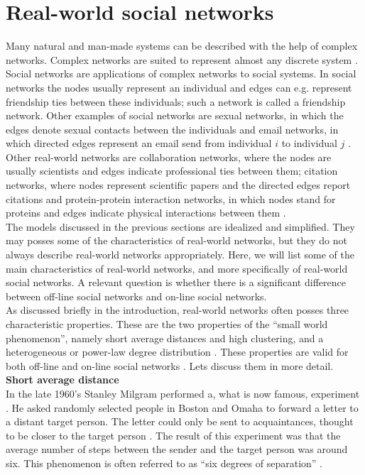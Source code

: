 \documentclass[11 pt , letterpaper , twoside , openright]{book}
\begin{document}
\section{Real-world social networks}\label{realWorld}

Many natural and man-made systems can be described with the help of complex networks. Complex networks are suited to represent almost any discrete system \cite{Costa2008}. Social networks are applications of complex networks to social systems. In social networks the nodes usually represent an individual and edges can e.g. represent friendship ties between these individuals; such a network is called a friendship network. Other examples of social networks are sexual networks, in which the edges denote sexual contacts between the individuals and email networks, in which directed edges represent an email send from individual $i$ to individual $j$ \cite{Costa2008}. Other real-world networks are collaboration networks, where the nodes are usually scientists and edges indicate professional ties between them; citation networks, where nodes represent scientific papers and the directed edges report citations and protein-protein interaction networks, in which nodes stand for proteins and edges indicate physical interactions between them \cite{Costa2008}.\\
\newline
The models discussed in the previous sections are idealized and simplified. They may posses some of the characteristics of real-world networks, but they do not always describe real-world networks appropriately. Here, we will list some of the main characteristics of real-world networks, and more specifically of real-world social networks. A relevant question is whether there is a significant difference between off-line social networks and on-line social networks.\\
\newline
As discussed briefly in the introduction, real-world networks often posses three characteristic properties. These are the two properties of the ``small world phenomenon'', namely short average distances and high clustering, and a heterogeneous or power-law degree distribution \cite{RealWorld}. These properties are valid for both off-line and on-line social networks \cite{Zhang2014}. Lets discuss them in more detail.\\
\newline
\textbf{Short average distance}\\
\newline
In the late 1960's Stanley Milgram performed a, what is now famous, experiment \cite{Newman2003}. He asked randomly selected people in Boston and Omaha to forward a letter to a distant target person. The letter could only be sent to acquaintances, thought to be closer to the target person \cite{RealWorld}. The result of this experiment was that the average number of steps between the sender and the target person was around six. This phenomenon is often referred to as ``six degrees of separation'' \cite{RealWorld}.\\
\end{document}
